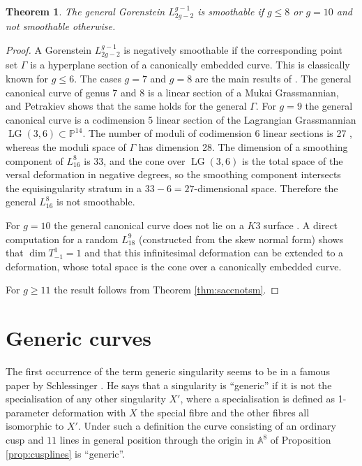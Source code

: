 \documentclass{amsart}
\renewcommand{\P}{\mathbb{P}}
\newcommand{\A}{\mathbb{A}}
\newtheorem{thm}{Theorem}[section]
\theoremstyle{definition}
\theoremstyle{remark}
\begin{document}
 \begin{thm}
 The general Gorenstein $L_{2g-2}^{g-1}$ is smoothable if $g\leq 8$ or $g=10$ and not smoothable otherwise.
 \end{thm}
 \begin{proof}
A  Gorenstein $L_{2g-2}^{g-1}$ is negatively smoothable if the corresponding point set $\Gamma$ is  a
hyperplane section of a canonically embedded curve. This is classically known for
$g\leq 6$. The cases $g=7$ and $g=8$ are the main results of \cite{Pe}.  The general canonical
curve of genus 7 and 8 is a linear section of a Mukai Grassmannian, and Petrakiev shows that 
the same holds for the general $\Gamma$. For $g=9$ the general canonical curve
is a codimension 5 linear section of the Lagrangian Grassmannian 
$\operatorname{LG}(3,6)\subset \P^{14}$. The number of  moduli of codimension 6 linear
sections is 27 \cite[Sect. 4]{Pe}, whereas the moduli space of $\Gamma$ has dimension 28.
The dimension of a smoothing component of $L_{16}^8$ is 33, and the cone over
$\operatorname{LG}(3,6)$
is the total space of the versal deformation in negative degrees, so the smoothing component
intersects the equisingularity stratum in a $33-6=27$-dimensional space.  Therefore the general 
$L_{16}^8$  is not smoothable.
 
 For $g=10$ the general canonical curve does not lie on a $K3$ surface \cite{Muk}.
 A direct computation for a random $L_{18}^9$ (constructed from the skew normal form)
 shows that $\dim T^1_{-1}=1$ and that this infinitesimal
 deformation can be extended to a deformation, whose total space is the cone over a 
 canonically embedded curve. 
 
 For $g\geq 11$ the result follows from Theorem \ref{thm:saccnotsm}.
  \end{proof}

\section{Generic curves}
The first occurrence of the  term generic singularity  seems to be in a famous paper by 
Schlessinger \cite{Sc}. He says that a singularity is ``generic'' if it is not the specialisation of any other
singularity $X'$, where a specialisation is defined as 1-parameter deformation
with $X$ the special fibre and the other fibres all isomorphic to $X'$. Under such a definition
the curve  consisting of  an ordinary cusp and $11$ lines in general
position through the origin in    $\A^8$ of Proposition \ref{prop:cusplines} is ``generic''.
\end{document}
